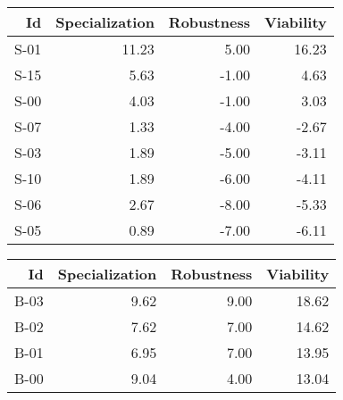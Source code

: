 


\begin{tabular}{ | r | r | r | r | }
    \hline
                    Id  &  Specialization  &      Robustness  &       Viability  \\
    \hline
    \hline
                  S-01  &           11.23  &            5.00  &           16.23  \\
    \hline
                  S-15  &            5.63  &           -1.00  &            4.63  \\
    \hline
                  S-00  &            4.03  &           -1.00  &            3.03  \\
    \hline
                  S-07  &            1.33  &           -4.00  &           -2.67  \\
    \hline
                  S-03  &            1.89  &           -5.00  &           -3.11  \\
    \hline
                  S-10  &            1.89  &           -6.00  &           -4.11  \\
    \hline
                  S-06  &            2.67  &           -8.00  &           -5.33  \\
    \hline
                  S-05  &            0.89  &           -7.00  &           -6.11  \\
    \hline
\end{tabular}


\begin{tabular}{ | r | r | r | r | }
    \hline
                    Id  &  Specialization  &      Robustness  &       Viability  \\
    \hline
    \hline
                  B-03  &            9.62  &            9.00  &           18.62  \\
    \hline
                  B-02  &            7.62  &            7.00  &           14.62  \\
    \hline
                  B-01  &            6.95  &            7.00  &           13.95  \\
    \hline
                  B-00  &            9.04  &            4.00  &           13.04  \\
    \hline
\end{tabular}


